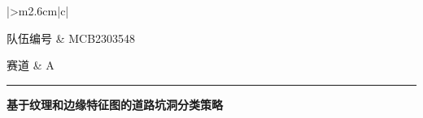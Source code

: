 \documentclass[a4paper, 10pt]{article}
\begin{document}
	
	\begin{table}[!htbp]
		\centering
		\small
			\begin{tabular}{|>{\centering\arraybackslash}m{2.6cm}|c|}
				
				\hline
				
				队伍编号 & MCB2303548 \\
				
				\hline
				
				赛道 & A  \\
				
				\hline
				
			\end{tabular}

	\end{table}
	
	\begin{center}
		\color{gray}\rule{0.8\linewidth}{1pt}
	\end{center}
	
	\begin{center}
		{\Large \bfseries \songti 基于纹理和边缘特征图的道路坑洞分类策略}\\[1em] %

	\end{center}
	
	\renewcommand{\figurename}{图} %
	
	\renewcommand{\tablename}{表}
	
	\renewcommand{\cfttoctitlefont}{\hfill\Large\bfseries\songti}
	\renewcommand{\cftaftertoctitle}{\hfill}
	\renewcommand{\contentsname}{\Large\bfseries\songti目录}
	\renewcommand{\abstractname}{\Large\bfseries\songti摘要}
	\renewcommand{\refname}{\normalsize\bfseries\songti参考文献}
	
\end{document}
